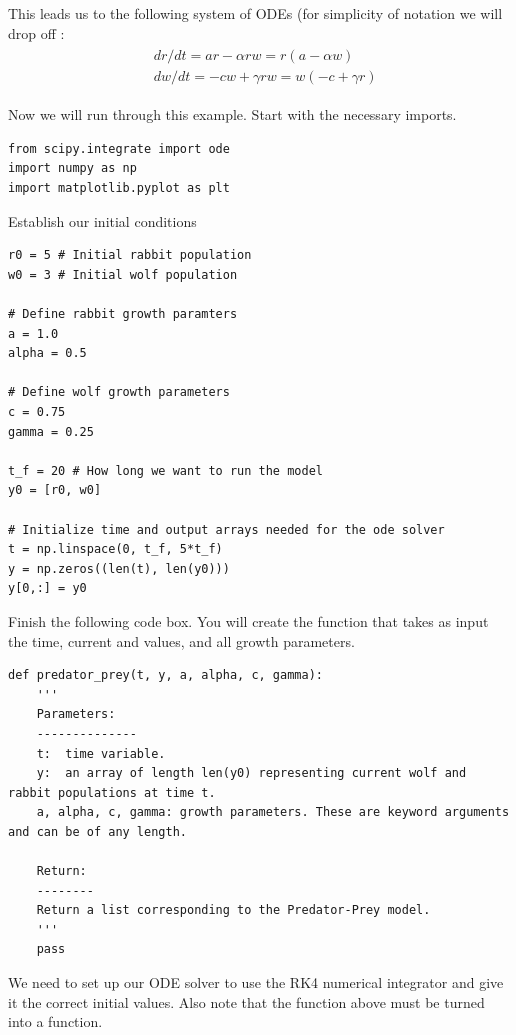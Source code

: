 This leads us to the following system of ODEs (for simplicity of notation we will drop off :
\begin{align}
	\begin{split}
	&dr/dt = ar - \alpha r w = r(a - \alpha w)\\
	&dw/dt = -cw + \gamma r w = w(-c + \gamma r)
	\end{split}\label{eqn: Pred-Prey}
\end{align}

Now we will run through this example.
Start with the necessary imports.

\begin{lstlisting}
from scipy.integrate import ode
import numpy as np
import matplotlib.pyplot as plt
\end{lstlisting}

Establish our initial conditions

\begin{lstlisting}
r0 = 5 # Initial rabbit population
w0 = 3 # Initial wolf population

# Define rabbit growth paramters
a = 1.0
alpha = 0.5

# Define wolf growth parameters
c = 0.75
gamma = 0.25

t_f = 20 # How long we want to run the model
y0 = [r0, w0]

# Initialize time and output arrays needed for the ode solver
t = np.linspace(0, t_f, 5*t_f)
y = np.zeros((len(t), len(y0)))
y[0,:] = y0
\end{lstlisting}

\begin{problem}
Finish the following code box. You will create the function that takes as input the time, current  and  values, and all growth parameters.
\begin{lstlisting}
def predator_prey(t, y, a, alpha, c, gamma):
	'''
	Parameters:
	--------------
	t:	time variable.
	y:	an array of length len(y0) representing current wolf and rabbit populations at time t.
	a, alpha, c, gamma:	growth parameters. These are keyword arguments and can be of any length.
	
	Return:
	--------
	Return a list corresponding to the Predator-Prey model.
	'''
	pass
\end{lstlisting}
\end{problem}

We need to set up our ODE solver to use the RK4 numerical integrator and give it the correct initial values.
Also note that the  function above must be turned into a  function.

